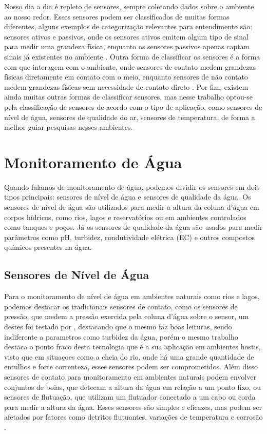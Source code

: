 Nosso dia a dia é repleto de sensores, sempre coletando dados sobre o ambiente ao nosso redor. Esses sensores podem ser classificados de muitas formas diferentes, alguns exemplos de categorização relevantes para entendimento são: sensores ativos e passivos, onde os sensores ativos emitem algum tipo de sinal para medir uma grandeza física, enquanto os sensores passivos apenas captam sinais já existentes no ambiente \cite{javaid_2021_sensors}. Outra forma de classificar os sensores é a forma com que interagem com o ambiente, onde sensores de contato medem grandezas físicas diretamente em contato com o meio, enquanto sensores de não contato medem grandezas físicas sem necessidade de contato direto \cite{javaid_2021_sensors, mohindru_2023_development, wu_2023_a}. Por fim, existem ainda muitas outras formas de classificar sensores, mas nesse trabalho optou-se pela classificação de sensores de acordo com o tipo de aplicação, como sensores de nível de água, sensores de qualidade do ar, sensores de temperatura, de forma a melhor guiar pesquisas nesses ambientes. 


\section{Monitoramento de Água}\label{sec:water_monitoring}

Quando falamos de monitoramento de água, podemos dividir os sensores em dois tipos principais: sensores de nível de água e sensores de qualidade da água. Os sensores de nível de água são utilizados para medir a altura da coluna d'água em corpos hídricos, como rios, lagos e reservatórios ou em ambientes controlados como tanques e poços. Já os sensores de qualidade da água são usados para medir parâmetros como pH, turbidez, condutividade elétrica (EC) e outros compostos químicos presentes na água.

\subsection{Sensores de Nível de Água}\label{subsec:water_level_sensors}

Para o monitoramento de nível de água em ambientes naturais como rios e lagos, podemos destacar os tradicionais sensores de contato, como os sensores de pressão, que medem a pressão exercida pela coluna d'água sobre o sensor, um destes foi testado por \textcite{santana_2024_development}, destacando que o mesmo faz boas leituras, sendo indiferente a parametros como turbidez da água, porém o mesmo trabalho destaca o ponto fraco desta tecnologia que é a sua aplicação em ambientes hostis, visto que em situaçoes como a cheia do rio, onde há uma grande quantidade de entulhos e forte correnteza, esses sensores podem ser comprometidos. Além disso sensores de contato para monitoramento em ambientes naturais podem envolver conjuntos de boias, que detecam a altura da água em relação a um ponto fixo, ou sensores de flutuação, que utilizam um flutuador conectado a um cabo ou corda para medir a altura da água. Esses sensores são simples e eficazes, mas podem ser afetados por fatores como detritos flutuantes, variações de temperatura e corrosão \cite{mohammadrezamasoudimoghaddam_2024_a,santana_2024_development,paul_2020_a,yukawa_2025_an} .

